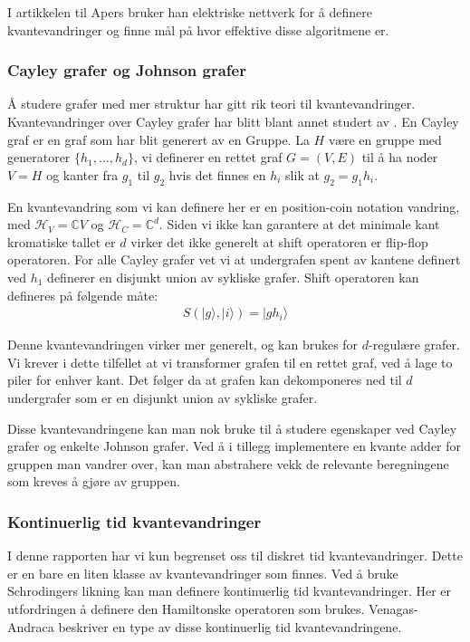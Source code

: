         I artikkelen til Apers \cite{apers2019unified} bruker han elektriske nettverk for å definere kvantevandringer og finne mål på hvor effektive disse algoritmene er.
    
    \subsubsection*{Cayley grafer og Johnson grafer}

        Å studere grafer med mer struktur har gitt rik teori til kvantevandringer. Kvantevandringer over Cayley grafer har blitt blant annet studert av \cite{dai2018discretetime}. En Cayley graf er en graf som har blit generert av en Gruppe. La $H$ være en gruppe med generatorer $\{h_1,...,h_d\}$, vi definerer en rettet graf $G=(V,E)$ til å ha noder $V=H$ og kanter fra $g_1$ til $g_2$ hvis det finnes en $h_i$ slik at $g_2 = g_1h_i$.
        
        En kvantevandring som vi kan definere her er en position-coin notation vandring, med $\mathcal{H}_V=\mathbb{C}V$ og $\mathcal{H}_C=\mathbb{C}^d$. Siden vi ikke kan garantere at det minimale kant kromatiske tallet er $d$ virker det ikke generelt at shift operatoren er flip-flop operatoren. For alle Cayley grafer vet vi at undergrafen spent av kantene definert ved $h_1$ definerer en disjunkt union av sykliske grafer. Shift operatoren kan defineres på følgende måte:
        \begin{align*}
            S(|g\rangle,|i\rangle) = |gh_i\rangle
        \end{align*}
        
        Denne kvantevandringen virker mer generelt, og kan brukes for $d$-regulære grafer. Vi krever i dette tilfellet at vi transformer grafen til en rettet graf, ved å lage to piler for enhver kant. Det følger da at grafen kan dekomponeres ned til $d$ undergrafer som er en disjunkt union av sykliske grafer.
        
        Disse kvantevandringene kan man nok bruke til å studere egenskaper ved Cayley grafer og enkelte Johnson grafer. Ved å i tillegg implementere en kvante adder for gruppen man vandrer over, kan man abstrahere vekk de relevante beregningene som kreves å gjøre av gruppen.
    
    \subsubsection{Kontinuerlig tid kvantevandringer}
    
        I denne rapporten har vi kun begrenset oss til diskret tid kvantevandringer. Dette er en bare en liten klasse av kvantevandringer som finnes. Ved å bruke Schrodingers likning kan man definere kontinuerlig tid kvantevandringer. Her er utfordringen å definere den Hamiltonske operatoren som brukes. Venagas-Andraca \cite{Venegas_Andraca_2012} beskriver en type av disse kontinuerlig tid kvantevandringene.
        
